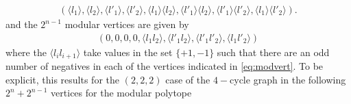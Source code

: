 \begin{equation}
\begin{aligned}\label{eq:nonmodvert}
\left( \langle l_1 \rangle, \langle l_2 \rangle, \langle l'_1 \rangle, \langle l'_2 \rangle, \langle l_1 \rangle \langle l_2 \rangle, \langle l'_1 \rangle \langle l_2 \rangle, \langle l'_1 \rangle \langle l'_2 \rangle, \langle l_1 \rangle \langle l'_2 \rangle  \right).
\end{aligned}
\end{equation}
and the $2^{n-1}$ modular vertices are given by
\begin{equation}
\begin{aligned}\label{eq:modvert}
\left( 0, 0, 0, 0, \langle l_1 l_2 \rangle, \langle l'_1 l_2 \rangle, \langle l'_1 l'_2 \rangle, \langle l_1 l'_2 \rangle  \right)
\end{aligned}
\end{equation}
where the $\langle l_i l_{i+1} \rangle$ take values in the set $\{+1,-1\}$ such that there are an odd number of negatives in each of the vertices indicated in \ref{eq:modvert}. To be explicit, this results for the $(2,2,2)$ case of the $4-$cycle graph in the following $2^n + 2^{n-1}$ vertices for the modular polytope
